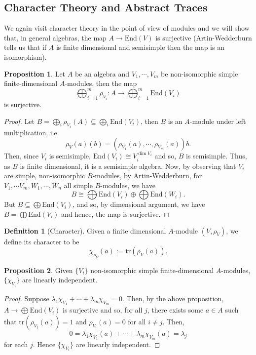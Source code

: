 \documentclass[]{article}
\theoremstyle{definition}
\theoremstyle{definition}
\newtheorem{definition}{Definition}[section]
\newtheorem{proposition}{Proposition}[section]
\begin{document}
\subsection{Character Theory and Abstract Traces}

We again visit character theory in the point of view of modules and we will 
show that, in general algebras, the map \(A \to \text{End}(V)\) is surjective 
(Artin-Wedderburn tells us that if \(A\) is finite dimensional and semisimple 
then the map is an isomorphism).

\begin{proposition}
  Let \(A\) be an algebra and \(V_1, \cdots, V_m\) be non-isomorphic simple 
  finite-dimensional \(A\)-modules, then the map
  \[\bigoplus_{i = 1}^m \rho_{V_i} : A \to \bigoplus_{i = 1}^m \text{End}(V_i)\] 
  is surjective.
\end{proposition}
\begin{proof}
  Let \(B = \bigoplus_i \rho_{V_i}(A) \subseteq \bigoplus_i \text{End}(V_i)\), 
  then \(B\) is an \(A\)-module under left multiplication, i.e.
  \[\rho_V(a)(b) = (\rho_{V_1}(a), \cdots, \rho_{V_m}(a))b.\]
  Then, since \(V_i\) is semisimple, \(\text{End}(V_i) \cong V_i^{\dim V_i}\) 
  and so, \(B\) is semisimple. Thus, as \(B\) is finite dimensional, it 
  is a semisimple algebra. Now, by observing that \(V_i\) are simple, non-isomorphic 
  \(B\)-modules, by Artin-Wedderburn, for \(V_1, \cdots V_m, W_1, \cdots, W_n\)
  all simple \(B\)-modules, we have 
  \[B \cong \bigoplus \text{End}(V_i) \oplus \bigoplus \text{End}(W_i).\]
  But \(B \subseteq \bigoplus \text{End}(V_i)\), and so, by dimensional 
  argument, we have \(B = \bigoplus \text{End}(V_i)\) and hence, the map is 
  surjective.
\end{proof}

\begin{definition}[Character]
  Given a finite dimensional \(A\)-module \((V, \rho_V)\), we define its 
  character to be 
  \[\chi_{\rho_V}(a) := \text{tr}(\rho_V(a)).\]
\end{definition}

\begin{proposition}
  Given \(\{V_i\}\) non-isomorphic simple finite-dimensional \(A\)-modules,
  \(\{\chi_{V_i}\}\) are linearly independent.
\end{proposition}
\begin{proof}
  Suppose \(\lambda_1 \chi_{V_1} + \cdots + \lambda_m \chi_{V_m} = 0\). Then, 
  by the above proposition, \(A \to \bigoplus \text{End}(V_i)\) is surjective and 
  so, for all \(j\), there exists some \(a \in A\) such that 
  \(\text{tr}(\rho_{V_j}(a)) = 1\) and \(\rho_{V_i}(a) = 0\) for all \(i \neq j\).
  Then, 
  \[0 = \lambda_1 \chi_{V_1}(a) + \cdots + \lambda_m \chi_{V_m}(a) = \lambda_j\]
  for each \(j\). Hence \(\{\chi_{V_i}\}\) are linearly independent.
\end{proof}
\end{document}
